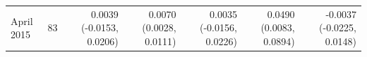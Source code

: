 \begin{tabular}{lrrrrrr}
April 2015 & 83 & 0.0039 (-0.0153, 0.0206) & 0.0070 (0.0028, 0.0111) & 0.0035 (-0.0156, 0.0226) & 0.0490 (0.0083, 0.0894) & -0.0037 (-0.0225, 0.0148) \\

\end{tabular}
